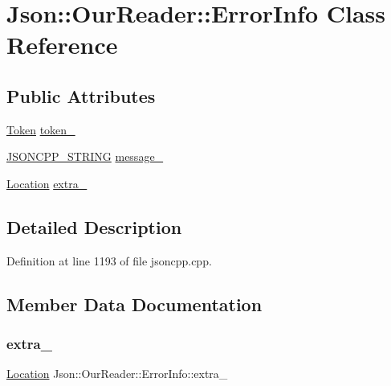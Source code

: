 \hypertarget{class_json_1_1_our_reader_1_1_error_info}{}\section{Json\+:\+:Our\+Reader\+:\+:Error\+Info Class Reference}
\label{class_json_1_1_our_reader_1_1_error_info}
\subsection*{Public Attributes}
\begin{DoxyCompactItemize}
\item 
\hyperlink{class_json_1_1_our_reader_1_1_token}{Token} \hyperlink{class_json_1_1_our_reader_1_1_error_info_ad05204ecabe5e7201a842935b874ae9a}{token\+\_\+}
\item 
\hyperlink{config_8h_a1e723f95759de062585bc4a8fd3fa4be}{J\+S\+O\+N\+C\+P\+P\+\_\+\+S\+T\+R\+I\+NG} \hyperlink{class_json_1_1_our_reader_1_1_error_info_af14b6bf58ee1cb3388c18ee336ee2394}{message\+\_\+}
\item 
\hyperlink{class_json_1_1_our_reader_a1bdc7bbc52ba87cae6b19746f2ee0189}{Location} \hyperlink{class_json_1_1_our_reader_1_1_error_info_a77ba2d32a471c7b9bc14621b76a5bdab}{extra\+\_\+}
\end{DoxyCompactItemize}


\subsection{Detailed Description}


Definition at line 1193 of file jsoncpp.\+cpp.



\subsection{Member Data Documentation}
\hypertarget{class_json_1_1_our_reader_1_1_error_info_a77ba2d32a471c7b9bc14621b76a5bdab}{}\label{class_json_1_1_our_reader_1_1_error_info_a77ba2d32a471c7b9bc14621b76a5bdab} 
\subsubsection{\texorpdfstring{extra\+\_\+}{extra\_}}
{\footnotesize\ttfamily \hyperlink{class_json_1_1_our_reader_a1bdc7bbc52ba87cae6b19746f2ee0189}{Location} Json\+::\+Our\+Reader\+::\+Error\+Info\+::extra\+\_\+}



